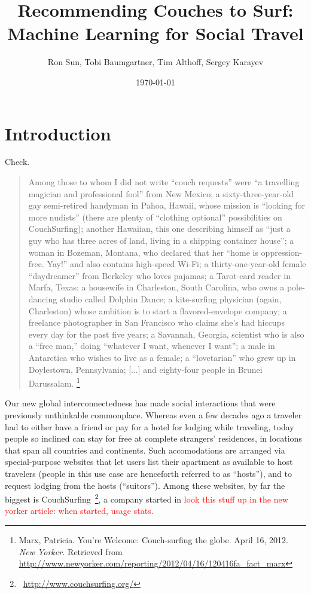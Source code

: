\documentclass[11pt]{article}
\title{Recommending Couches to Surf: Machine Learning for Social Travel}
\author{Ron Sun, Tobi Baumgartner, Tim Althoff, Sergey Karayev}
\date{\today}
\newcommand{\todo}[1]{\textcolor{red}{#1}}
\begin{document}
\maketitle

\section{Introduction}
Check.

\begin{quote}
Among those to whom I did not write “couch requests” were “a travelling magician and professional fool” from New Mexico; a sixty-three-year-old gay semi-retired handyman in Pahoa, Hawaii, whose mission is “looking for more nudists” (there are plenty of “clothing optional” possibilities on CouchSurfing); another Hawaiian, this one describing himself as “just a guy who has three acres of land, living in a shipping container house”; a woman in Bozeman, Montana, who declared that her “home is oppression-free. Yay!” and also contains high-speed Wi-Fi; a thirty-one-year-old female “daydreamer” from Berkeley who loves pajamas; a Tarot-card reader in Marfa, Texas; a housewife in Charleston, South Carolina, who owns a pole-dancing studio called Dolphin Dance; a kite-surfing physician (again, Charleston) whose ambition is to start a flavored-envelope company; a freelance photographer in San Francisco who claims she’s had hiccups every day for the past five years; a Savannah, Georgia, scientist who is also a “free man,” doing “whatever I want, whenever I want”; a male in Antarctica who wishes to live as a female; a “lovetarian” who grew up in Doylestown, Pennsylvania; [...] and eighty-four people in Brunei Darussalam.
\footnote{Marx, Patricia. You're Welcome: Couch-surfing the globe. April 16, 2012. \emph{New Yorker.} Retrieved from \url{http://www.newyorker.com/reporting/2012/04/16/120416fa_fact_marx}}
\end{quote}

Our new global interconnectedness has made social interactions that were previously unthinkable commonplace.
Whereas even a few decades ago a traveler had to either have a friend or pay for a hotel for lodging while traveling, today people so inclined can stay for free at complete strangers' residences, in locations that span all countries and continents.
Such accomodations are arranged via special-purpose websites that let users list their apartment as available to host travelers (people in this use case are henceforth referred to as ``hosts''), and to request lodging from the hosts (``suitors'').
Among these websites, by far the biggest is CouchSurfing~\footnote{~\url{http://www.couchsurfing.org/}}, a company started in \todo{look this stuff up in the new yorker article: when started, usage stats.}
\end{document}
